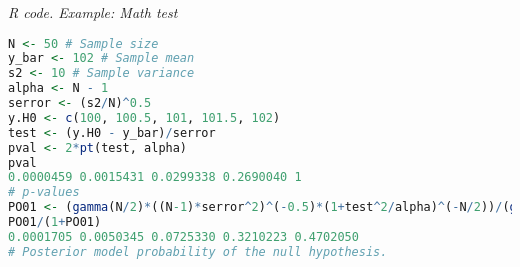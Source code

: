 \begin{enumerate}[leftmargin=*]
\begin{tcolorbox}[enhanced,width=4.67in,center upper,
	fontupper=\large\bfseries,drop shadow southwest,sharp corners]
	\textit{R code. Example: Math test}
\begin{VF}
\begin{lstlisting}[language=R]
N <- 50 # Sample size
y_bar <- 102 # Sample mean 
s2 <- 10 # Sample variance
alpha <- N - 1
serror <- (s2/N)^0.5 
y.H0 <- c(100, 100.5, 101, 101.5, 102)
test <- (y.H0 - y_bar)/serror
pval <- 2*pt(test, alpha)
pval
0.0000459 0.0015431 0.0299338 0.2690040 1
# p-values
PO01 <- (gamma(N/2)*((N-1)*serror^2)^(-0.5)*(1+test^2/alpha)^(-N/2))/(gamma(1/2)*gamma((N-1)/2))
PO01/(1+PO01)
0.0001705 0.0050345 0.0725330 0.3210223 0.4702050
# Posterior model probability of the null hypothesis.
\end{lstlisting}
\end{VF}
\end{tcolorbox}

	
\end{enumerate}